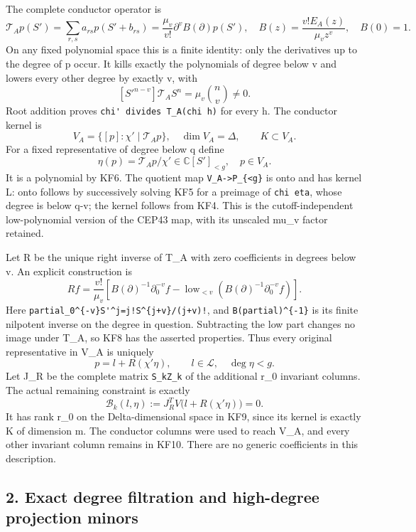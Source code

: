 \documentclass[11pt]{article}
\begin{document}
The complete conductor operator is \[
\mathcal T_Ap(S')=\sum_{r,s}a_{rs}p(S'+b_{rs})
=\frac{\mu_v}{v!}\partial^v B(\partial)p(S'),\quad
B(z)=\frac{v!E_A(z)}{\mu_vz^v},\quad B(0)=1.
\tag{KF4}
\] On any fixed polynomial space this is a finite identity: only the derivatives up to the degree of p occur. It kills exactly the polynomials of degree below v and lowers every other degree by exactly v, with \[
[S'^{n-v}]\mathcal T_A S^n=\mu_v\binom nv\ne0.
\tag{KF5}
\] Root addition proves \nolinkurl{chi' divides T_A(chi h)} for every h. The conductor kernel is \[
V_A=\{[p]:\chi'\mid\mathcal T_Ap\},\quad \dim V_A=\Delta,
\qquad K\subset V_A.
\tag{KF6}
\] For a fixed representative of degree below q define \[
\eta(p)=\mathcal T_Ap/\chi'\in\mathbb C[S']_{<g},\quad p\in V_A.
\tag{KF7}
\] It is a polynomial by KF6. The quotient map \texttt{V\_A-\textgreater{}P\_\{\textless{}g\}} is onto and has kernel L: onto follows by successively solving KF5 for a preimage of \texttt{chi\textquotesingle{}\ eta}, whose degree is below q-v; the kernel follows from KF4. This is the cutoff-independent low-polynomial version of the CEP43 map, with its unscaled mu\_v factor retained.

Let R be the unique right inverse of T\_A with zero coefficients in degrees below v. An explicit construction is \[
R f=\frac{v!}{\mu_v}
 \left[B(\partial)^{-1}\partial^{-v}_0f
 -\operatorname{low}_{<v}(B(\partial)^{-1}\partial^{-v}_0f)\right].
\tag{KF8}
\] Here \nolinkurl{partial_0^{-v}S'^j=j!S^{j+v}/(j+v)!}, and \texttt{B(partial)\^{}\{-1\}} is its finite nilpotent inverse on the degree in question. Subtracting the low part changes no image under T\_A, so KF8 has the asserted properties. Thus every original representative in V\_A is uniquely \[
p=l+R(\chi'\eta),\qquad l\in\mathcal L,\quad\deg\eta<g.
\tag{KF9}
\] Let J\_R be the complete matrix \texttt{S\_kZ\_k} of the additional r\_0 invariant columns. The actual remaining constraint is exactly \[
\mathcal B_k(l,\eta):=J_R^TV\bigl(l+R(\chi'\eta)\bigr)=0.
\tag{KF10}
\] It has rank r\_0 on the Delta-dimensional space in KF9, since its kernel is exactly K of dimension m. The conductor columns were used to reach V\_A, and every other invariant column remains in KF10. There are no generic coefficients in this description.

\subsection{2. Exact degree filtration and high-degree projection minors}\label{exact-degree-filtration-and-high-degree-projection-minors}
\end{document}
